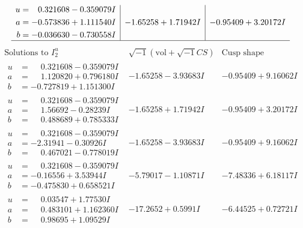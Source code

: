 \documentclass[1p]{elsarticle_modified}
\theoremstyle{definition}
\newcommand{\I}{\sqrt{-1}}
\begin{document}
$$\begin{array}{c|c|c}
\begin{aligned}
u &= \phantom{-}0.321608 - 0.359079 I \\
a &= -0.573836 + 1.111540 I \\
b &= -0.036630 - 0.730558 I\end{aligned}
 & -1.65258 + 1.71942 I & -0.95409 + 3.20172 I\\
 \hline 
 \end{array}$$\newpage$$\begin{array}{c|c|c}  
\text{Solutions to }I^u_{2}& \I (\text{vol} + \sqrt{-1}CS) & \text{Cusp shape}\\
 \hline 
\begin{aligned}
u &= \phantom{-}0.321608 - 0.359079 I \\
a &= \phantom{-}1.120820 + 0.796180 I \\
b &= -0.727819 + 1.151300 I\end{aligned}
 & -1.65258 - 3.93683 I & -0.95409 + 9.16062 I \\ \hline\begin{aligned}
u &= \phantom{-}0.321608 - 0.359079 I \\
a &= \phantom{-}1.56692 - 0.28239 I \\
b &= \phantom{-}0.488689 + 0.785333 I\end{aligned}
 & -1.65258 + 1.71942 I & -0.95409 + 3.20172 I \\ \hline\begin{aligned}
u &= \phantom{-}0.321608 - 0.359079 I \\
a &= -2.31941 - 0.30926 I \\
b &= \phantom{-}0.467021 - 0.778019 I\end{aligned}
 & -1.65258 - 3.93683 I & -0.95409 + 9.16062 I \\ \hline\begin{aligned}
u &= \phantom{-}0.321608 - 0.359079 I \\
a &= -0.16556 + 3.53944 I \\
b &= -0.475830 + 0.658521 I\end{aligned}
 & -5.79017 - 1.10871 I & -7.48336 + 6.18117 I \\ \hline\begin{aligned}
u &= \phantom{-}0.03547 + 1.77530 I \\
a &= \phantom{-}0.483101 + 1.162360 I \\
b &= \phantom{-}0.98695 + 1.09529 I\end{aligned}
 & -17.2652 + 0.5991 I & -6.44525 + 0.72721 I \\ \hline\begin{aligned}

\end{aligned}
\end{array}$$
\end{document}
